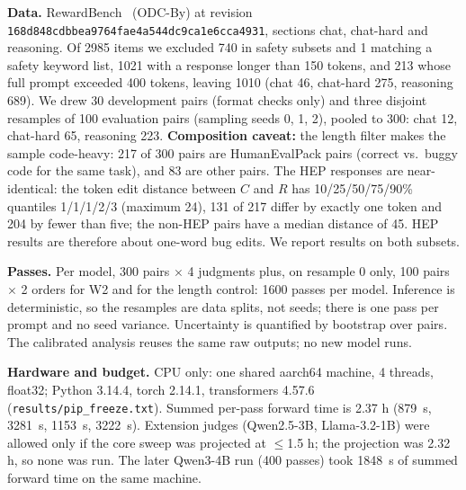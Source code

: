 \documentclass[conference]{IEEEtran}
\begin{document}
\textbf{Data.} RewardBench~\cite{lambert2024rewardbench} (ODC-By) at revision
\texttt{168d848cdbbea9764fae4a544dc9ca1e6cca4931}, sections chat, chat-hard and reasoning. Of 2985 items we
excluded 740 in safety subsets and 1 matching a safety keyword list, 1021 with a response longer than 150
tokens, and 213 whose full prompt exceeded 400 tokens, leaving 1010 (chat 46, chat-hard 275, reasoning 689).
We drew 30 development pairs (format checks only) and three disjoint resamples of 100 evaluation pairs
(sampling seeds 0, 1, 2), pooled to 300: chat 12, chat-hard 65, reasoning 223. \textbf{Composition caveat:}
the length filter makes the sample code-heavy: 217 of 300 pairs are HumanEvalPack pairs (correct vs.\ buggy
code for the same task), and 83 are other pairs. The HEP responses are near-identical: the token edit distance
between $C$ and $R$ has 10/25/50/75/90\% quantiles 1/1/1/2/3 (maximum 24), 131 of 217 differ by exactly one
token and 204 by fewer than five; the non-HEP pairs have a median distance of 45. HEP results are therefore about
one-word bug edits. We report results on both subsets.

\textbf{Passes.} Per model, 300 pairs $\times$ 4 judgments plus, on resample 0 only, 100 pairs $\times$ 2 orders
for W2 and for the length control: 1600 passes per model. Inference is deterministic, so the resamples are
data splits, not seeds; there is one pass per prompt and no seed variance. Uncertainty is quantified by
bootstrap over pairs. The calibrated analysis reuses the same raw outputs; no new model runs.

\textbf{Hardware and budget.} CPU only: one shared aarch64 machine, 4 threads, float32; Python 3.14.4, torch
2.14.1, transformers 4.57.6 (\texttt{results/pip\_freeze.txt}). Summed per-pass forward time is 2.37 h (879~s,
3281~s, 1153~s, 3222~s). Extension judges (Qwen2.5-3B, Llama-3.2-1B) were allowed only if the core sweep was
projected at $\le$1.5 h; the projection was 2.32 h, so none was run. The later Qwen3-4B run (400 passes) took
1848~s of summed forward time on the same machine.
\end{document}
